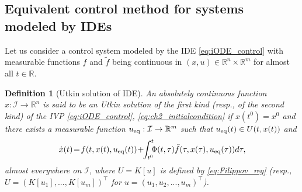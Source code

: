 \documentclass{article}
\newcommand{\R}{\mathbb{R}}
\newtheorem{definition}{Definition}
\begin{document}
\subsection{Equivalent control method for systems modeled by IDEs}
Let us consider a control system modeled by the IDE \eqref{eq:iODE_control} with
measurable functions $f$ and $\tilde f$ being continuous in $(x,u)\in \R^n\times \R^m$ for almost all $t\in \R$.
\begin{definition}[Utkin solution of IDE]\label{def:Utkin_sol_iODE}
\itshape An absolutely continuous function $x: \mathcal{I}\to \R^n$  is said to be an Utkin solution of the first kind (resp., of the second kind) of the IVP  \eqref{eq:iODE_control}, \eqref{eq:ch2_initialcondition} if $x(t^0)=x^0$ and there exists a measurable function $u_{\rm eq}:\mathcal{I}\to \R^m$ such that $u_{\rm eq}(t)\in U(t,x(t))$ and\vspace{-1mm}
\begin{equation}\label{eq:iODE_Utkin}
\!\,	\dot x(t)\!=\! f(t,x(t), u_{\rm eq}(t))\!+\!\!\int^t_{t^0}\!\!\!\Phi(t,\tau)\tilde f(\tau,x(\tau),u_{\rm eq}(\tau)) d\tau, \!\vspace{-1mm}
\end{equation}
almost everywhere on $\mathcal{I}$, where $U=K[u]$ is defined by \eqref{eq:Filippov_reg}
(resp., $U=(K[u_1], ..., K[u_m])^{\top}$ for $u=(u_1, u_2,...,u_m)^{\top}$).
\end{definition}
\end{document}
